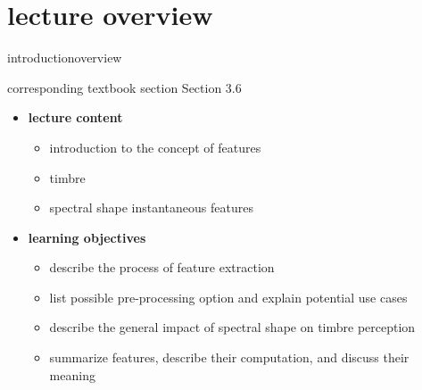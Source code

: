     \section[overview]{lecture overview}
        \begin{frame}{introduction}{overview}
            \begin{block}{corresponding textbook section}
                    Section 3.6
            \end{block}

            \begin{itemize}
                \item   \textbf{lecture content}
                    \begin{itemize}
                        \item   introduction to the concept of features
                        \item   timbre
                        \item   spectral shape instantaneous features
                   \end{itemize}
                \bigskip
                \item<2->   \textbf{learning objectives}
                    \begin{itemize}
                        \item   describe the process of feature extraction
                        \item   list possible pre-processing option and explain potential use cases
                        \item   describe the general impact of spectral shape on timbre perception
                        \item   summarize features, describe their computation, and discuss their meaning
                    \end{itemize}
            \end{itemize}
        \end{frame}

